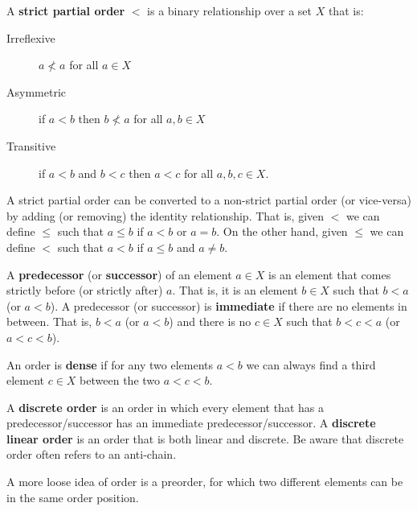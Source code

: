 \documentclass{bareminimum}
\begin{document}
\begin{defn}
	A \textbf{strict partial order}  $<$ is a binary relationship over a set $X$ that is:
	\begin{description}
		\item[Irreflexive] $a \nless a$ for all $a \in X$
		\item[Asymmetric] if $a < b$ then $b \nless a$ for all $a, b \in X$
		\item[Transitive] if $a < b$ and $b < c$ then $a < c$ for all $a, b, c \in X$.
	\end{description}
\end{defn}

\begin{prop}
	A strict partial order can be converted to a non-strict partial order (or vice-versa) by adding (or removing) the identity relationship. That is, given $<$ we can define $\leq$ such that $a \leq b$ if $a < b$ or $a = b$. On the other hand, given $\leq$ we can define $<$ such that $a < b$ if $a \leq b$ and $a \neq b$.
\end{prop}

\begin{defn}
	A \textbf{predecessor}  (or \textbf{successor}) of an element $a \in X$ is an element that comes strictly before (or strictly after) $a$. That is, it is an element $b \in X$ such that $b < a$ (or $a < b$). A predecessor (or successor) is  \textbf{immediate} if there are no elements in between. That is, $b < a$ (or $a < b$) and there is no $c \in X$ such that $b < c < a$  (or $a < c < b$).
\end{defn}

\begin{defn}
	An order is \textbf{dense}  if for any two elements $a < b$ we can always find a third element $c \in X$ between the two $a < c < b$.
\end{defn}

\begin{defn}
	A \textbf{discrete order}  is an order in which every element that has a predecessor/successor has an immediate predecessor/successor. A \textbf{discrete linear order} is an order that is both linear and discrete. Be aware that discrete order often refers to an anti-chain.
\end{defn}

A more loose idea of order is a preorder, for which two different elements can be in the same order position.
\end{document}
